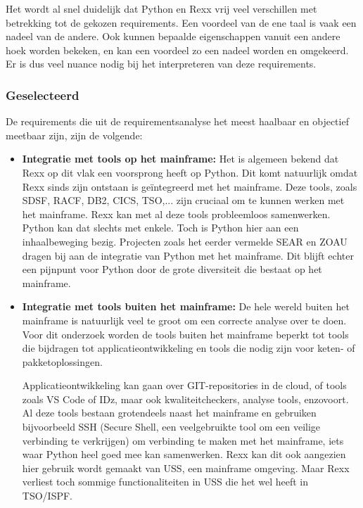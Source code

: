 Het wordt al snel duidelijk dat Python en Rexx vrij veel verschillen met betrekking tot de gekozen requirements. Een voordeel van de ene taal is vaak een nadeel van de andere. Ook kunnen bepaalde eigenschappen vanuit een andere hoek worden bekeken, en kan een voordeel zo een nadeel worden en omgekeerd. Er is dus veel nuance nodig bij het interpreteren van deze requirements.
\subsubsection{Geselecteerd}
De requirements die uit de requirementsanalyse het meest haalbaar en objectief meetbaar zijn, zijn de volgende:
\begin{itemize}
    \item \textbf{Integratie met tools op het mainframe:} Het is algemeen bekend dat Rexx op dit vlak een voorsprong heeft op Python. Dit komt natuurlijk omdat Rexx sinds zijn ontstaan is geïntegreerd met het mainframe. Deze tools, zoals SDSF, RACF, DB2, CICS, TSO,... zijn cruciaal om te kunnen werken met het mainframe. Rexx kan met al deze tools probleemloos samenwerken. Python kan dat slechts met enkele. Toch is Python hier aan een inhaalbeweging bezig. Projecten zoals het eerder vermelde SEAR en ZOAU dragen bij aan de integratie van Python met het mainframe. Dit blijft echter een pijnpunt voor Python door de grote diversiteit die bestaat op het mainframe.
    \item \textbf{Integratie met tools buiten het mainframe:} De hele wereld buiten het mainframe is natuurlijk veel te groot om een correcte analyse over te doen. Voor dit onderzoek worden de tools buiten het mainframe beperkt tot tools die bijdragen tot applicatieontwikkeling en tools die nodig zijn voor keten- of pakketoplossingen.
    
    Applicatieontwikkeling kan gaan over GIT-repositories in de cloud, of tools zoals VS Code of IDz, maar ook kwaliteitcheckers, analyse tools, enzovoort. Al deze tools bestaan grotendeels naast het mainframe en gebruiken bijvoorbeeld SSH (Secure Shell, een veelgebruikte tool om een veilige verbinding te verkrijgen) om verbinding te maken met het mainframe, iets waar Python heel goed mee kan samenwerken. Rexx kan dit ook aangezien hier gebruik wordt gemaakt van USS, een mainframe omgeving. Maar Rexx verliest toch sommige functionaliteiten in USS die het wel heeft in TSO/ISPF.
    

\end{itemize}
